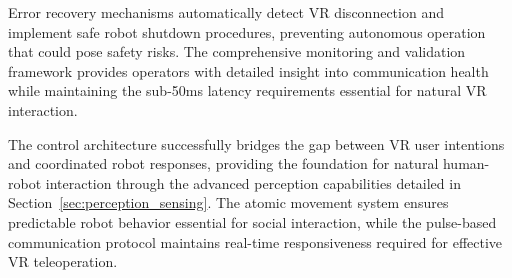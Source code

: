 Error recovery mechanisms automatically detect VR disconnection and implement safe robot shutdown procedures, preventing autonomous operation that could pose safety risks. The comprehensive monitoring and validation framework provides operators with detailed insight into communication health while maintaining the sub-50ms latency requirements essential for natural VR interaction.

The control architecture successfully bridges the gap between VR user intentions and coordinated robot responses, providing the foundation for natural human-robot interaction through the advanced perception capabilities detailed in Section~\ref{sec:perception_sensing}. The atomic movement system ensures predictable robot behavior essential for social interaction, while the pulse-based communication protocol maintains real-time responsiveness required for effective VR teleoperation.
